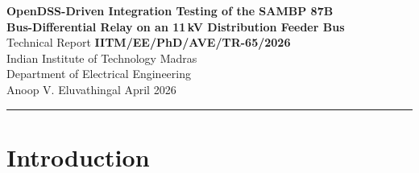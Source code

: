 \documentclass[12pt,a4paper]{article}
\begin{document}

\begin{center}
  {\Large\bfseries
   OpenDSS-Driven Integration Testing of the SAMBP 87B\\[4pt]
   Bus-Differential Relay on an 11\,kV Distribution Feeder Bus}\\[12pt]
  {\large Technical Report \textbf{IITM/EE/PhD/AVE/TR-65/2026}}\\[6pt]
  {\large Indian Institute of Technology Madras\\
   Department of Electrical Engineering}\\[6pt]
  {\normalsize Anoop V. Eluvathingal \quad\quad April 2026}\\[6pt]
  \rule{\textwidth}{0.8pt}
\end{center}

\begin{abstract}
This report presents an integration test of the SAMBP 87B bus-differential
protection pipeline on an \SI{11}{\kilo\volt} distribution feeder bus modelled
in OpenDSS\@.  The test network comprises a voltage-source grid equivalent
feeding three radial feeders; six fault scenarios are exercised: normal load,
external three-phase faults on two feeder buses (with and without CT saturation,
with and without distributed generation), and internal bus faults (single-phase
A-G and three-phase).  Fault current phasors are extracted from OpenDSS via the
\texttt{opendssdirect} interface; time-domain waveforms are synthesised with
physics-correct DC offsets that cancel for external faults and accumulate for
internal faults.  CT saturation is modelled with a dynamic knee set at 60\,\%
of the fault-current peak.  All six scenarios are correctly classified
(6/6\,=\,100\,\%): no spurious trips on external faults, correct trips on both
internal faults, and robust no-trip decisions under CT saturation and DG reverse
infeed.  The percentage-differential relay's inherent restraint during
through-faults eliminates the need for a Stage-2 veto in the CT-saturation
scenario at this setting point.
\end{abstract}

\tableofcontents
\listoftables

\section{Introduction}
\label{sec:intro}
\end{document}
